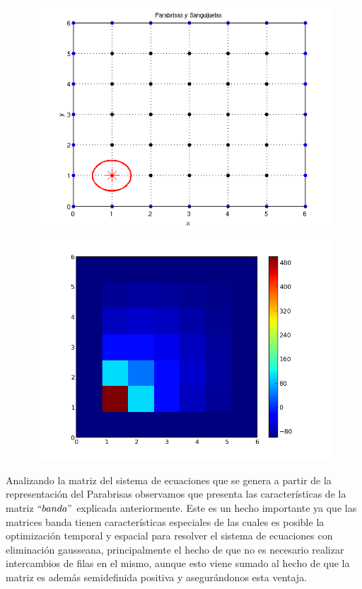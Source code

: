 \begin{figure}[htb]
\begin{center}
\includegraphics[scale=0.40]{imagenes/matrizbandaej_instancia.png} 
\includegraphics[scale=0.40]{imagenes/matrizbandaej_temp.png} 
\end{center}
\end{figure}

\newpage

Analizando la matriz del sistema de ecuaciones que se genera a partir de la representación del Parabrisas observamos que presenta las características de la matriz $``banda"$ explicada anteriormente. 
Este es un hecho importante ya que las matrices banda tienen características especiales de las cuales es posible la optimización temporal y espacial para resolver el sistema de ecuaciones con eliminación gausseana, principalmente el hecho de que no es necesario realizar intercambios de filas en el mismo, aunque esto viene sumado al hecho de que la matriz es además semidefinida positiva y asegurándonos esta ventaja.


